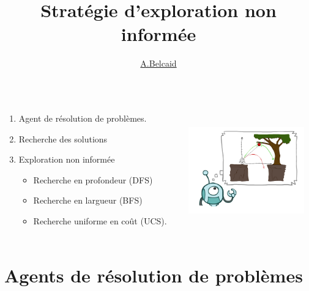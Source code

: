 \documentclass{beamer}
\title{Stratégie d'exploration non informée}
\author{\underline{A.Belcaid}}
\institute{\small ENSA-Fès}
\begin{document}
\maketitle

\begin{frame}
\begin{columns}
  \begin{column}{0.6\textwidth}
    {
      \begin{enumerate}
        \item Agent de résolution de problèmes.\\[0.5cm]
        \item Recherche des solutions\\[0.5cm]
        \item Exploration non informée
          \begin{itemize}
            \small
            \item Recherche en profondeur (DFS)\\[0.2cm]
            \item Recherche en largueur  (BFS)\\[0.2cm]
             \item Recherche uniforme en coût (UCS).
          \end{itemize}
      \end{enumerate} 
    
    }
  \end{column}
  \begin{column}{0.4\textwidth}
  \centering
  \includegraphics[width=5cm,height=5cm]{./images/agent_contents.png}
  \end{column}
\end{columns}
\end{frame}



\section{Agents de résolution de problèmes}%
\label{sec:agents_de_resolution_de_problemes}
\end{document}
